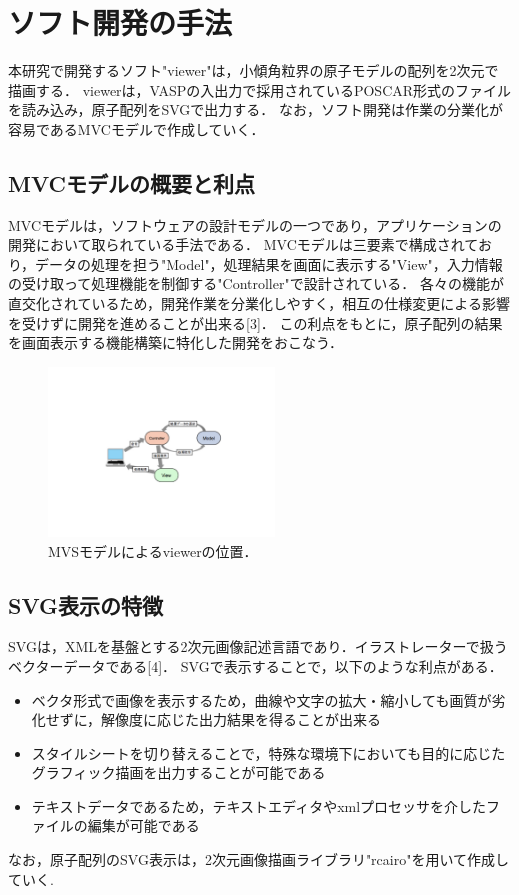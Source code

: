 
\section{ソフト開発の手法}
本研究で開発するソフト"viewer"は，小傾角粒界の原子モデルの配列を2次元で描画する．
viewerは，VASPの入出力で採用されているPOSCAR形式のファイルを読み込み，原子配列をSVGで出力する．
なお，ソフト開発は作業の分業化が容易であるMVCモデルで作成していく．

\subsection{MVCモデルの概要と利点}
MVCモデルは，ソフトウェアの設計モデルの一つであり，アプリケーションの開発において取られている手法である．
MVCモデルは三要素で構成されており，データの処理を担う"Model"，処理結果を画面に表示する"View"，入力情報の受け取って処理機能を制御する"Controller"で設計されている．
各々の機能が直交化されているため，開発作業を分業化しやすく，相互の仕様変更による影響を受けずに開発を進めることが出来る[3]．
この利点をもとに，原子配列の結果を画面表示する機能構築に特化した開発をおこなう．

\begin{figure}[htbp]\begin{center}
\includegraphics[width=6cm,bb=0 0 442 432]{../figs/./boundary_narita.005.jpg}
\caption{MVSモデルによるviewerの位置．}
\label{default}\end{center}\end{figure}
\subsection{SVG表示の特徴}
SVGは，XMLを基盤とする2次元画像記述言語であり．イラストレーターで扱うベクターデータである[4]．
SVGで表示することで，以下のような利点がある．

\begin{itemize}
\item ベクタ形式で画像を表示するため，曲線や文字の拡大・縮小しても画質が劣化せずに，解像度に応じた出力結果を得ることが出来る
\item スタイルシートを切り替えることで，特殊な環境下においても目的に応じたグラフィック描画を出力することが可能である
\item テキストデータであるため，テキストエディタやxmlプロセッサを介したファイルの編集が可能である
\end{itemize}
なお，原子配列のSVG表示は，2次元画像描画ライブラリ"rcairo"を用いて作成していく.

